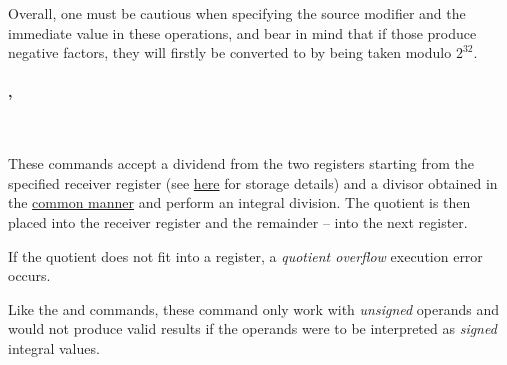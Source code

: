 Overall, one must be cautious when specifying the source modifier and
the immediate value in these operations, and bear in mind that if those produce
negative factors, they will firstly be converted to  by being taken
modulo $2^{32}$.

\vspace{-0.35cm}

\paragraph{, }\

These commands accept a  dividend from the two registers starting
from the specified receiver register (see \hyperlink{types:two_words_storage}{here}
for storage details) and a  divisor obtained in the
\hyperlink{types:twos_complement}{common manner} and perform an integral division.
The quotient is then placed into the receiver register and the remainder -- into
the next register.

If the quotient does not fit into a register, a \textit{quotient overflow}
execution error occurs.

Like the  and  commands, these command only work with
\textit{unsigned} operands and would not produce valid results if the operands
were to be interpreted as \textit{signed} integral values.
